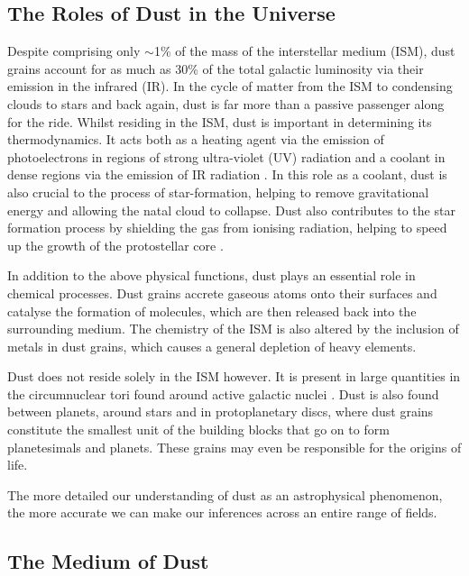 \subsection{The Roles of Dust in the Universe}

Despite comprising only $\sim$1\% of the mass of the interstellar medium (ISM), dust grains account for as much as 30\% of the total galactic luminosity \citep{Li2003} via their emission in the infrared (IR).  In the cycle of matter from the ISM to condensing clouds to stars and back again, dust is far more than a passive passenger along for the ride.  Whilst residing in the ISM, dust is important in determining its thermodynamics.  It acts both as a heating agent via the emission of photoelectrons in regions of strong ultra-violet (UV) radiation and a coolant in dense regions via the emission of IR radiation \citep{Tielens2005}.  In this role as a coolant, dust is also crucial to the process of star-formation, helping to remove gravitational energy and allowing the natal cloud to collapse.  Dust also contributes to the star formation process by shielding the gas from ionising radiation, helping to speed up the growth of the protostellar core \citep{Draine2011}. 

In addition to the above physical functions, dust plays an essential role in chemical processes.  Dust grains  accrete gaseous atoms onto their surfaces and catalyse the formation of molecules, which are then released back into the surrounding medium.  The chemistry of the ISM is also altered by the inclusion of metals in dust grains, which causes a general depletion of heavy elements.

Dust does not reside solely in the ISM however.  It is present in  large quantities in the circumnuclear tori found around active galactic nuclei \citep{Jaffe2004}.  Dust is also found between planets, around stars and in protoplanetary discs, where dust grains constitute the smallest unit of the building blocks that  go on to form planetesimals and planets.  These grains may even be responsible for the origins of life.  

The more detailed our understanding of dust as an astrophysical phenomenon, the more accurate we can make our inferences across an entire range of  fields.  


\subsection{The Medium of Dust}
\label{scn:dust_med}

